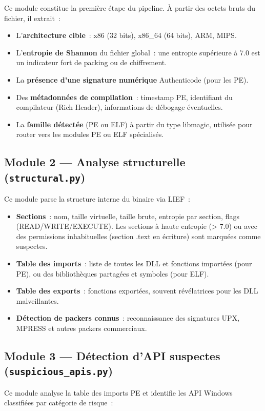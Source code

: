 Ce module constitue la première étape du pipeline. À partir des octets bruts du fichier, il extrait~:
\begin{itemize}
  \item L'\textbf{architecture cible}~: x86 (32 bits), x86\_64 (64 bits), ARM, MIPS.
  \item L'\textbf{entropie de Shannon} du fichier global~: une entropie supérieure à 7.0 est un indicateur fort de packing ou de chiffrement.
  \item La \textbf{présence d'une signature numérique} Authenticode (pour les PE).
  \item Des \textbf{métadonnées de compilation}~: timestamp PE, identifiant du compilateur (Rich Header), informations de débogage éventuelles.
  \item La \textbf{famille détectée} (PE ou ELF) à partir du type libmagic, utilisée pour router vers les modules PE ou ELF spécialisés.
\end{itemize}

\subsection{Module 2 --- Analyse structurelle (\texttt{structural.py})}

Ce module parse la structure interne du binaire via LIEF~:
\begin{itemize}
  \item \textbf{Sections}~: nom, taille virtuelle, taille brute, entropie par section, flags (READ/WRITE/EXECUTE). Les sections à haute entropie (> 7.0) ou avec des permissions inhabituelles (section .text en écriture) sont marquées comme suspectes.
  \item \textbf{Table des imports}~: liste de toutes les DLL et fonctions importées (pour PE), ou des bibliothèques partagées et symboles (pour ELF).
  \item \textbf{Table des exports}~: fonctions exportées, souvent révélatrices pour les DLL malveillantes.
  \item \textbf{Détection de packers connus}~: reconnaissance des signatures UPX, MPRESS et autres packers commerciaux.
\end{itemize}

\subsection{Module 3 --- Détection d'API suspectes (\texttt{suspicious\_apis.py})}

Ce module analyse la table des imports PE et identifie les API Windows classifiées par catégorie de risque~:

